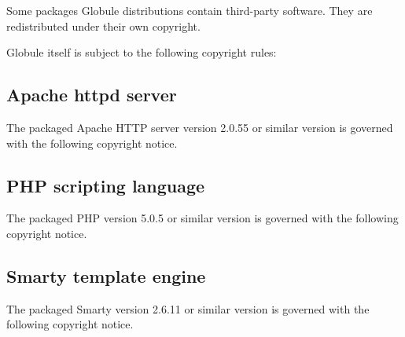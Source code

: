 \documentclass[10pt,a4paper]{article}
\makeatletter
\newenvironment{p}{\@open{P}{}}{\@close{P}}
\newenvironment{p}{}{\par}
\newcommand\subsectionbr{}
\makeatother
\begin{document}
\begin{p}
Some packages Globule distributions contain third-party software.  They are
redistributed under their own copyright.
\end{p}

\begin{p}
Globule itself is subject to the following copyright rules:
\end{p}



\newpage
\subsection{Apache httpd server\subsectionbr}

\begin{p}
The packaged Apache HTTP server version 2.0.55 or similar version is governed
with the following copyright notice.
\end{p}

{\tiny\begin{multicols}{2}\end{multicols}}

\newpage
\subsection{PHP scripting language\subsectionbr}

\begin{p}
The packaged PHP version 5.0.5 or similar version is governed with the
following copyright notice.
\end{p}

{\tiny\begin{multicols}{2}\end{multicols}}

\newpage
\subsection{Smarty template engine\subsectionbr}

\begin{p}
The packaged Smarty version 2.6.11 or similar version is governed with the
following copyright notice.
\end{p}

{\tiny\begin{multicols}{2}\end{multicols}}
\end{document}
